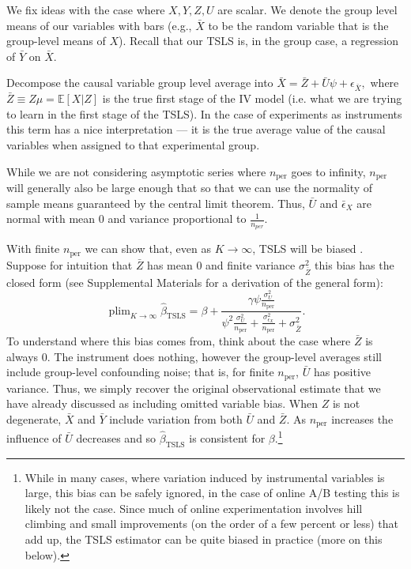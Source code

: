 \documentclass{article}
\newcommand\E{\mathbb{E}}
\newcommand\nper{{n_{\text{per}}}}
\DeclareMathOperator*{\plim}{plim}
\begin{document}
We fix ideas with the case where $X, Y, Z, U$ are scalar. We denote the group level means of our variables with bars (e.g., $\bar{X}$ to be the random variable that is the group-level means of $X$). Recall that our TSLS is, in the group case, a regression of $\bar{Y}$ on $\bar{X}$.

Decompose the causal variable group level average into $\bar{X} = \bar{Z} + \bar{U} \psi + \epsilon_{\bar{X}},$ where $\bar{Z} \equiv Z \mu = \E[X | Z]$ is the true first stage of the IV model (i.e. what we are trying to learn in the first stage of the TSLS).  In the case of experiments as instruments this term has a nice interpretation --- it is the true average value of the causal variables when assigned to that experimental group.

While we are not considering asymptotic series where $\nper$ goes to infinity, $\nper$ will generally also be large enough that so that we can use the normality of sample means guaranteed by the central limit theorem. Thus, $\bar{U}$ and $\bar{\epsilon}_X$ are normal with mean $0$ and variance proportional to $\frac{1}{n_{per}}.$

With finite $\nper$ we can show that, even as $K \to \infty$, TSLS will be biased \citep[cf.][]{bekker1994alternative, angrist1995split}. Suppose for intuition that $\bar{Z}$ has mean $0$ and finite variance $\sigma^2_{\bar{Z}}$ this bias has the closed form (see Supplemental Materials for a derivation of the general form):
$$
\plim_{K \to \infty} \hat{\beta}_\text{TSLS} = \beta + \frac{\gamma \psi \frac{ \sigma^2_{U}}{\nper}}{\psi^{2} \frac{\sigma^2_U}{\nper}  + \frac{\sigma^2_{\epsilon_X}}{\nper} + \sigma^2_{\bar{Z}}}.
$$
To understand where this bias comes from, think about the case where $\bar{Z}$ is always $0$. The instrument does nothing, however the group-level averages still include group-level confounding noise; that is, for finite $\nper$, $\bar{U}$ has positive variance. Thus, we simply recover the original observational estimate that we have already discussed as including omitted variable bias. When $Z$ is not degenerate, $\bar{X}$ and $\bar{Y}$ include variation from both $\bar{U}$ and $\bar{Z}$. As $\nper$ increases the influence of $\bar{U}$ decreases and so $\hat{\beta}_{\text{TSLS}}$ is consistent for $\beta.$\footnote{While in many cases, where variation induced by instrumental variables is large, this bias can be safely ignored, in the case of online A/B testing this is likely not the case. Since much of online experimentation involves hill climbing and small improvements (on the order of a few percent or less) that add up, the TSLS estimator can be quite biased in practice (more on this below).}
\end{document}
